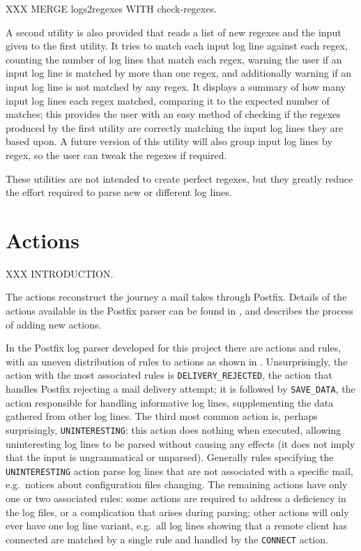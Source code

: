 XXX MERGE logs2regexes WITH check-regexes.

A second utility is also provided that reads a list of new regexes and
the input given to the first utility.  It tries to match each input log
line against each regex, counting the number of log lines that match
each regex, warning the user if an input log line is matched by more
than one regex, and additionally warning if an input log line is not
matched by any regex.  It displays a summary of how many input log lines
each regex matched, comparing it to the expected number of matches; this
provides the user with an easy method of checking if the regexes
produced by the first utility are correctly matching the input log lines
they are based upon.  A future version of this utility will also group
input log lines by regex, so the user can tweak the regexes if
required.

These utilities are not intended to create perfect regexes, but they
greatly reduce the effort required to parse new or different log lines.

\section{Actions}

\label{actions in implementation}

XXX INTRODUCTION\@.

The actions reconstruct the journey a mail takes through Postfix.  Details
of the actions available in the Postfix parser can be found in
, and  describes the process of adding new actions.

In the Postfix log parser developed for this project there are
\numberOFactions{} actions and \numberOFrules{} rules, with an uneven
distribution of rules to actions as shown in .  Unsurprisingly, the action with the most associated
rules is \texttt{DELIVERY\_REJECTED}, the action that handles Postfix
rejecting a mail delivery attempt; it is followed by \texttt{SAVE\_DATA},
the action responsible for handling informative log lines, supplementing
the data gathered from other log lines.  The third most common action is,
perhaps surprisingly, \texttt{UNINTERESTING}: this action does nothing when
executed, allowing uninteresting log lines to be parsed without causing any
effects (it does not imply that the input is ungrammatical or unparsed).
Generally rules specifying the \texttt{UNINTERESTING} action parse log
lines that are not associated with a specific mail, e.g.\ notices about
configuration files changing.  The remaining actions have only one or two
associated rules: some actions are required to address a deficiency in the
log files, or a complication that arises during parsing;  other actions
will only ever have one log line variant, e.g.\ all log lines showing that
a remote client has connected are matched by a single rule and handled by
the \texttt{CONNECT} action.

